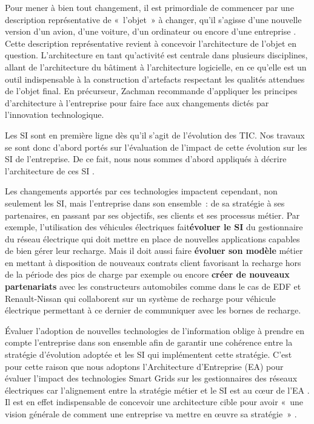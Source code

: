 Pour mener à bien tout changement, il est primordiale de commencer par une 
description représentative de «~l'objet~» à changer, qu'il s'agisse d'une nouvelle version d'un avion, d'une voiture, d'un ordinateur ou encore d'une entreprise \cite{zachman1997enterprise}. Cette description représentative revient à concevoir l'architecture de l'objet en question. L'architecture en tant qu'activité est centrale dans plusieurs disciplines, allant de l'architecture du bâtiment à l'architecture logicielle, en ce qu'elle est un outil indispensable à la construction d'artefacts respectant les qualités attendues de l'objet final. En précurseur, Zachman \cite{zachman1997enterprise} recommande d'appliquer les principes d'architecture à l'entreprise pour faire face aux changements dictés par l'innovation technologique.

Les SI sont en première ligne dès qu'il s'agit de l'évolution des TIC. Nos travaux se sont donc d'abord portés sur l'évaluation de l'impact de cette évolution sur les SI de l'entreprise. De ce fait, nous nous sommes d'abord appliqués à décrire l'architecture de ces SI \cite{seghiri2015simulation}. 

Les changements apportés par ces technologies impactent cependant, non seulement les SI, mais l'entreprise dans son ensemble~: de sa stratégie à ses partenaires, en passant par ses objectifs, ses clients et ses processus métier. Par exemple, l'utilisation des véhicules électriques fait\textbf{évoluer le SI} du gestionnaire du réseau électrique qui doit mettre en place de nouvelles applications capables de bien gérer leur recharge. Mais il doit aussi faire \textbf{évoluer son modèle} métier en mettant à disposition de nouveaux contrats client favorisant la recharge hors de la période des pics de charge par exemple ou encore \textbf{créer de nouveaux partenariats} avec les constructeurs automobiles comme dans le cas de EDF et Renault-Nissan qui collaborent sur un système de recharge pour véhicule électrique permettant à ce dernier de communiquer avec les bornes de recharge.

Évaluer l'adoption de nouvelles technologies de l'information oblige à prendre en compte l'entreprise dans son ensemble afin de garantir une cohérence entre la stratégie d'évolution adoptée et les SI qui implémentent cette stratégie. C'est pour cette raison que nous adoptons l'Architecture d'Entreprise (EA) pour évaluer l'impact des technologies Smart Grids sur les gestionnaires des réseaux électriques car l'alignement entre la stratégie métier et le SI est au cœur de l'EA \cite{zachman1997enterprise}. Il est en effet indispensable de concevoir une architecture cible pour avoir  «~une vision générale de comment une entreprise va mettre en œuvre sa stratégie~» \cite{ross2006enterprise}.

